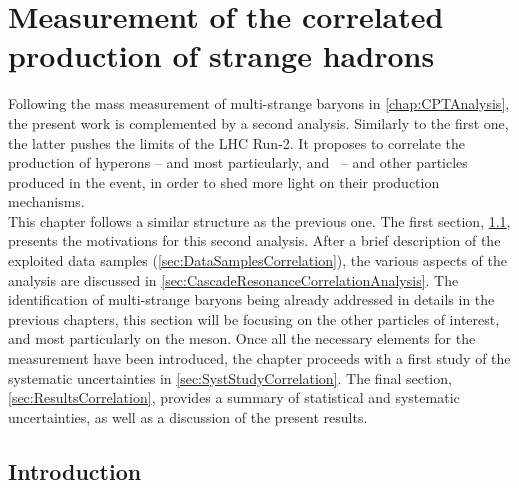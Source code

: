 \chapter{Measurement of the correlated production of strange hadrons}
\label{chap:CorrelatedAnalysis}

Following the mass measurement of multi-strange baryons in  \chap\ref{chap:CPTAnalysis}, the present work is complemented by a second analysis. Similarly to the first one, the latter pushes the limits of the LHC Run-2. It proposes to correlate the production of hyperons -- and most particularly, \rmXi and \rmOmega\ -- and other particles produced in the event, in order to shed more light on their production mechanisms.\\

This chapter follows a similar structure as the previous one. The first section, \Sec\ref{sec:IntroductionCorrelation}, presents the motivations for this second analysis. After a brief description of the exploited data samples (\Sec\ref{sec:DataSamplesCorrelation}), the various aspects of the analysis are discussed in \Sec\ref{sec:CascadeResonanceCorrelationAnalysis}. The identification of multi-strange baryons being already addressed in details in the previous chapters, this section will be focusing on the other particles of interest, and most particularly on the \rmPhiMes meson. Once all the necessary elements for the measurement have been introduced, the chapter proceeds with a first study of the systematic uncertainties in \Sec\ref{sec:SystStudyCorrelation}. The final section, \Sec\ref{sec:ResultsCorrelation}, provides a summary of statistical and systematic uncertainties, as well as a discussion of the present results.

\section{Introduction}
\label{sec:IntroductionCorrelation}

